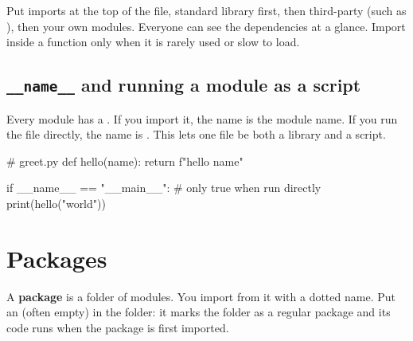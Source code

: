 \begin{gamerule}
Put imports at the top of the file, standard library first, then third-party (such as
), then your own modules. Everyone can see the dependencies at a glance.
Import inside a function only when it is rarely used or slow to load.
\end{gamerule}

\subsection{\texttt{\_\_name\_\_} and running a module as a script}

Every module has a . If you import it, the name is the module name. If you run
the file directly, the name is . This lets one file be both a library and a script.

\begin{pycode}
# greet.py
def hello(name):
    return f"hello {name}"

if __name__ == "__main__":      # only true when run directly
    print(hello("world"))
\end{pycode}

\section{Packages}

A \textbf{package} is a folder of modules. You import from it with a dotted name. Put an
(often empty)  in the folder: it marks the folder as a regular package and its
code runs when the package is first imported.

\begin{center}
\end{center}

